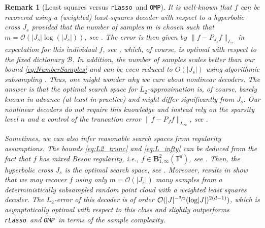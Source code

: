 \documentclass[11pt,reqno, a4paper]{article}
\numberwithin{equation}{section}
\newtheorem{remark}[theorem]{Remark}
\newcommand{\rlasso}{\texttt{rLasso}}
\newcommand{\omp}{\texttt{OMP}}
\begin{document}
\begin{remark}[Least squares versus \rlasso \ and \omp]\label{rem:lsqr}
It is well-known that $f$ can be recovered using a (weighted) least-squares decoder with respect to a hyperbolic cross $J_s$ provided that the number of samples $m$ is chosen such that $m = \mathcal{O}(\lvert J_s \rvert \log(\lvert J_s \rvert))$, see \cite{CoMi16, KamUllVol2021,KrUl21}.
The error is then given by $\|f-P_{J_s}f\|_{L_2}$ in expectation for this individual $f$, see \cite[Sect.\ 6]{KamUllVol2021}, which, of course, is optimal with respect to the fixed dictionary $\mathcal{B}$. 
In addition, the number of samples scales better than our bound \eqref{eq:NumberSamples} and can be even reduced to $O(|J_s|)$ using algorithmic subsampling \cite{BSU23}.
Thus, one might wonder why we care about nonlinear decoders.
The answer is that the optimal search space for $L_2$-approximation is, of course, barely known in advance (at least in practice) and might differ significantly from $J_s$.
Our nonlinear decoders do not require this knowledge and instead rely on the sparsity level $n$ and a control of the truncation error $\|f-P_{J}f\|_{L_\infty}$, see .

Sometimes, we can also infer reasonable search spaces from regularity assumptions.
The bounds \eqref{eq:L2_trunc} and \eqref{eq:L_infty} can be deduced from the fact that $f$ has mixed Besov regularity, i.e., $f \in \mathbf{B}^{2}_{1,\infty}(\mathbb{T}^d)$, see \cite[Chapt.\ 3]{DTU18}.
Then, the hyperbolic cross $J_s$ is the optimal search space, see \cite[Thm.\ 4.2.6]{DTU18}. 
Moreover, results in \cite{DKU23, KPUU24} show that we may recover $f$ using only $m = \mathcal{O}(\lvert J_s\rvert)$ many samples from a deterministically subsampled random point cloud with a weighted least squares decoder.
The $L_2$-error of this decoder is of order $\mathcal{O}(\lvert J\rvert^{-\sfrac{3}{2}}(\log \lvert J\rvert)^{2(d-1)})$, which is asymptotically optimal with respect to this class and slightly outperforms \rlasso \ and \omp \ in terms of the sample complexity.
\end{remark}
\end{document}
